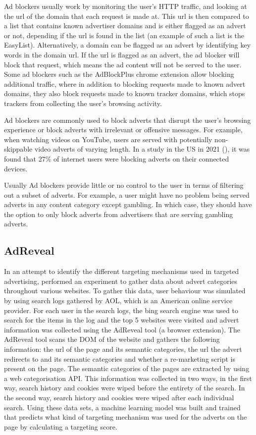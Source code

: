\documentclass{l4proj}
\begin{document}
Ad blockers usually work by monitoring the user's HTTP traffic, and looking at the url of the domain that each request is made at. This url is then compared to a list that contains known advertiser domains and is either flagged as an advert or not, depending if the url is found in the list (an example of such a list is the EasyList). Alternatively, a domain can be flagged as an advert by identifying key words in the domain url. If the url is flagged as an advert, the ad blocker will block that request, which means the ad content will not be served to the user. Some ad blockers such as the AdBlockPlus chrome extension allow blocking additional traffic, where in addition to blocking requests made to known advert domains, they also block requests made to known tracker domains, which stops trackers from collecting the user's browsing activity.

Ad blockers are commonly used to block adverts that disrupt the user's browsing experience or block adverts with irrelevant or offensive messages. For example, when watching videos on YouTube, users are served with potentially non-skippable video adverts of varying length. In a study in the US in 2021 (\cite{stats}), it was found that 27\% of internet users were blocking adverts on their connected devices. 

Usually Ad blockers provide little or no control to the user in terms of filtering out a subset of adverts. For example, a user might have no problem being served adverts in any content category except gambling. In which case, they should have the option to only block adverts from advertisers that are serving gambling adverts. 

\subsection{AdReveal}
In an attempt to identify the different targeting mechanisms used in targeted advertising, \cite{Liu2013} performed an experiment to gather data about advert categories throughout various websites. To gather this data, user behaviour was simulated by using search logs gathered by AOL, which is an American online service provider. 
For each user in the search logs, the bing search engine was used to search for the items in the log and the top 5 websites were visited and advert information was collected using the AdReveal tool (a browser extension). The AdReveal tool scans the DOM of the website and gathers the following information: the url of the page and its semantic categories, the url the advert redirects to and its semantic categories and whether a re-marketing script is present on the page. The semantic categories of the pages are extracted by using a web categorisation API. 
This information was collected in two ways, in the first way, search history and cookies were wiped before the entirety of the search. In the second way, search history and cookies were wiped after each individual search. Using these data sets, a machine learning model was built and trained that predicts what kind of targeting mechanism was used for the adverts on the page by calculating a targeting score.
\end{document}

